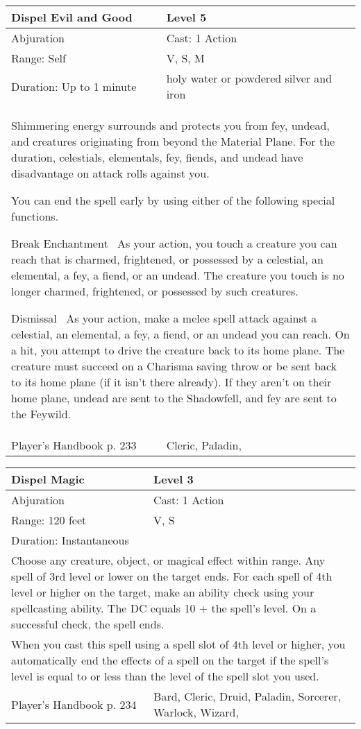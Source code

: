 \documentclass[11pt]{report}
\begin{document}
\begin{table}[H]
	\begin{tabular}{||p{6cm}|p{6cm}||}
		\hline\hline
		\bf{Dispel Evil and Good} & Level 5\\ \hline
		Abjuration & Cast: 1 Action\\ \hline
		Range: Self & V, S, M\\ \hline
		Duration: Up to 1 minute & holy water or powdered silver and iron\\ \hline
		\multicolumn{2}{||p{12cm}||}{Shimmering energy surrounds and protects you from fey, undead, and creatures originating from beyond the Material Plane. For the duration, celestials, elementals, fey, fiends, and undead have disadvantage on attack rolls against you. 

You can end the spell early by using either of the following special functions. 

Break  Enchantment 
As your action, you touch a creature you can reach that is charmed, frightened, or possessed by a celestial, an elemental, a fey, a fiend, or an undead. The creature you touch is no longer charmed, frightened, or possessed by such creatures. 

Dismissal 
As your action, make a melee spell attack against a celestial, an elemental, a fey, a fiend, or an undead you can reach. On a hit, you attempt to drive the creature back to its home plane. The creature must succeed on a Charisma saving throw or be sent back to its home plane (if it isn’t there already). If they aren’t on their home plane, undead are sent to the Shadowfell, and fey are sent to the Feywild.}\\ \hline
Player's Handbook p. 233 & Cleric, Paladin, \\ \hline\hline
	\end{tabular}
\end{table}

\begin{table}[H]
	\begin{tabular}{||p{6cm}|p{6cm}||}
		\hline\hline
		\bf{Dispel Magic} & Level 3\\ \hline
		Abjuration & Cast: 1 Action\\ \hline
		Range: 120 feet & V, S\\ \hline
		Duration: Instantaneous & \\ \hline
		\multicolumn{2}{||p{12cm}||}{Choose any creature, object, or magical effect within range. Any spell of 3rd level or lower on the target ends. For each spell of 4th level or higher on the target, make an ability check using your spellcasting ability. The DC equals 10 + the spell’s level. On a successful check, the spell ends.}\\ \hline
		\multicolumn{2}{||p{12cm}||}{When you cast this spell using a spell slot of 4th level or higher, you automatically end the effects of a spell on the target if the spell’s level is equal to or less than the level of the spell slot you used.}\\ \hline
Player's Handbook p. 234 & Bard, Cleric, Druid, Paladin, Sorcerer, Warlock, Wizard, \\ \hline\hline
	\end{tabular}
\end{table}
\end{document}
